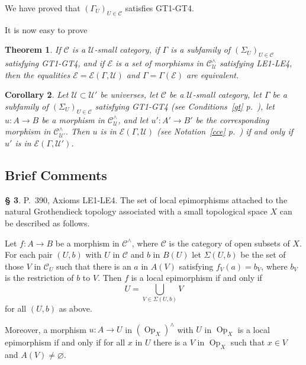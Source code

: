\documentclass[12pt]{article}%
\newtheorem{thm}{Theorem}%
\newtheorem{cor}[thm]{Corollary}
\theoremstyle{remark}
\theoremstyle{definition}
\newtheorem{s}[thm]{\S}%
\newcommand{\cc}{\mathcal}
\newcommand{\oo}{\operatorname}
\newcommand{\C}{\mathcal C}
\newcommand{\U}{\mathcal U}
\begin{document}
We have proved that $(\Gamma_U)_{U\in\C}$ satisfies GT1-GT4. 

It is now easy to prove 

\begin{thm}
If $\C$ is a $\U$-small category, if $\Gamma$ is a subfamily of $(\Sigma_U)_{U\in\C}$ satisfying GT1-GT4, and if $\cc E$ is a set of morphisms in $\C^\wedge_\U$ satisfying LE1-LE4, then the equalities $\cc E=\cc E(\Gamma,\U)$ and $\Gamma=\Gamma(\cc E)$ are equivalent.
\end{thm}

\begin{cor}\label{leu}
Let $\U\subset\U'$ be universes, let $\C$ be a $\U$-small category, let $\Gamma$ be a subfamily of $(\Sigma_U)_{U\in\C}$ satisfying GT1-GT4 (see Conditions~\ref{gt} p.~\pageref{gt}), let $u:A\to B$ be a morphism in $\C^\wedge_\U$, and let $u':A'\to B'$ be the corresponding morphism in $\C^\wedge_{\U'}$. Then $u$ is in $\cc E(\Gamma,\U)$ (see Notation~\ref{cce} p.~\pageref{cce}) if and only if $u'$ is in $\cc E(\Gamma,\U')$.
\end{cor}


\subsection{Brief Comments}

\begin{s}\label{390}
P.~390, Axioms LE1-LE4. The set of local epimorphisms attached to the natural Grothendieck topology associated with a small topological space $X$ can be described as follows. 

Let $f:A\to B$ be a morphism in $\C^\wedge$, where $\C$ is the category of open subsets of $X$. For each pair $(U,b)$ with $U$ in $\C$ and $b$ in $B(U)$ let $\Sigma(U,b)$ be the set of those $V$ in $\C_U$ such that there is an $a$ in $A(V)$ satisfying $f_V(a)=b_V$, where $b_V$ is the restriction of $b$ to $V$. Then $f$ is a local epimorphism if and only if 
$$
U=\bigcup_{V\in\Sigma(U,b)}V
$$ 
for all $(U,b)$ as above.

Moreover, a morphism $u:A\to U$ in $(\oo{Op}_X)^\wedge$ with $U$ in $\oo{Op}_X$ is a local epimorphism if and only if for all $x$ in $U$ there is a $V$ in $\oo{Op}_X$ such that $x\in V$ and $A(V)\ne\varnothing$. 
\end{s}

%

\begin{comment}
\begin{s}\label{16111}
P.~394, Proposition 16.1.11 (i). More generally, if $A\to D, B\to D$, and $C\to D$ are morphisms in $\C^\wedge$, and if $f:B\to C$ is a local epimorphism, then 
$$
A\times_Df:A\times_DB\to A\times_DC
$$ 
is a local epimorphism.
\end{s}
\end{comment}
\end{document}
